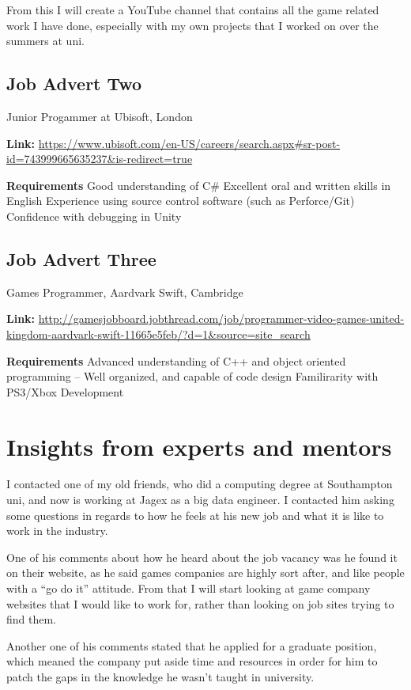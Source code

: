 \documentclass{scrartcl}
\begin{document}
From this I will create a YouTube channel that contains all the game related work I have done, especially with my own projects that I worked on over the summers at uni.

\subsection{Job Advert Two}
Junior Progammer at Ubisoft, London

\textbf{Link:} \url{https://www.ubisoft.com/en-US/careers/search.aspx#sr-post-id=743999665635237&is-redirect=true}

\textbf{Requirements}
Good understanding of C\# 
Excellent oral and written skills in English
Experience using source control software (such as Perforce/Git)
Confidence with debugging in Unity

\subsection{Job Advert Three}
Games Programmer, Aardvark Swift, Cambridge

\textbf{Link:}
\url{http://gamesjobboard.jobthread.com/job/programmer-video-games-united-kingdom-aardvark-swift-11665e5feb/?d=1&source=site_search}


\textbf{Requirements}
Advanced understanding of C++ and object oriented programming
– Well organized, and capable of code design
Familirarity with PS3/Xbox Development


\section{Insights from experts and mentors}

I contacted one of my old friends, who did a computing degree at Southampton uni, and now is working at Jagex as a big data engineer. 
I contacted him asking some questions in regards to how he feels at his new job and what it is like to work in the industry.

One of his comments about how he heard about the job vacancy was he found it on their website, as he said games companies are highly sort after, and like people with a ``go do it'' attitude.
From that I will start looking at game company websites that I would like to work for, rather than looking on job sites trying to find them.

Another one of his comments stated that he applied for a graduate position, which meaned the company put aside time and resources in order for him to patch the gaps in the knowledge he wasn't taught in university.





\end{document}

